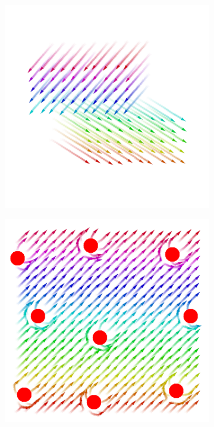 \begin{figure}[t]
\begin{subfigure}{0.32\textwidth}
  \caption{}
  \label{fig:towards-leader}
\end{subfigure}
\hfill
\begin{subfigure}{0.32\textwidth}
  \centering
  {\includegraphics[width=\textwidth]{papers/coordination2023-macro/images/branching.png}}
  \caption{}
  \label{fig:team}
\end{subfigure}
\hfill
\begin{subfigure}{0.32\textwidth}
  \centering
  {\includegraphics[width=\textwidth]{papers/coordination2023-macro/images/obstacle-avoidance.png}}

\end{subfigure}
\end{figure}
